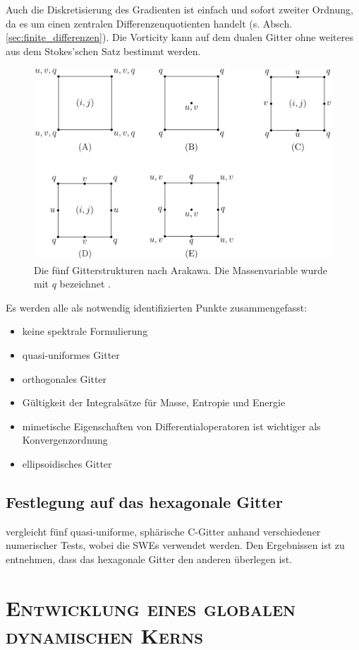 \documentclass{book}
\begin{document}
Auch die Diskretisierung des Gradienten ist einfach und sofort zweiter Ordnung, da es um einen zentralen Differenzenquotienten handelt (s. Absch. \ref{sec:finite_differenzen}). Die Vorticity kann auf dem dualen Gitter ohne weiteres aus dem Stokes'schen Satz bestimmt werden.

\begin{figure}
\centering
\includegraphics[width = .6\textwidth]{figs/arakawa.png}
\caption{Die fünf Gitterstrukturen nach Arakawa. Die Massenvariable wurde mit $q$ bezeichnet \cite{arakawa_grids_figure}.}
\label{fig:arakawa}
\end{figure}
%
Es werden alle als notwendig identifizierten Punkte zusammengefasst:
%
\begin{itemize}
\item keine spektrale Formulierung
\item quasi-uniformes Gitter
\item orthogonales Gitter
\item Gültigkeit der Integralsätze für Masse, Entropie und Energie
\item mimetische Eigenschaften von Differentialoperatoren ist wichtiger als Konvergenzordnung
\item ellipsoidisches Gitter
\end{itemize}

\section{Festlegung auf das hexagonale Gitter}
\label{sec:festlegung_auf_das_hexagonale_gitter}

\cite{weller} vergleicht fünf quasi-uniforme, sphärische C-Gitter anhand verschiedener numerischer Tests, wobei die SWEs verwendet werden. Den Ergebnissen ist zu entnehmen, dass das hexagonale Gitter den anderen überlegen ist.

\chapter{\normalfont\textsc{Entwicklung eines globalen dynamischen Kerns}}
\label{chap:entwicklung_eines_globalen_dynamischen_kerns}
\end{document}
